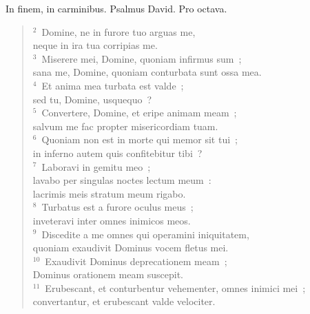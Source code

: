 \lettrine[lines=3,image=true,loversize=0.05,lraise=-0.03]{I}{}n finem, in carminibus. Psalmus David. Pro octava.
\begin{flushleft}\begin{verse}\vspace{6pt}${}^{2}$~Domine, ne in furore tuo arguas me,\\ neque in ira tua corripias me.\\
${}^{3}$~Miserere mei, Domine, quoniam infirmus sum~;\\ sana me, Domine, quoniam conturbata sunt ossa mea.\\
${}^{4}$~Et anima mea turbata est valde~;\\ sed tu, Domine, usquequo~?\\
${}^{5}$~Convertere, Domine, et eripe animam meam~;\\ salvum me fac propter misericordiam tuam.\\
${}^{6}$~Quoniam non est in morte qui memor sit tui~;\\ in inferno autem quis confitebitur tibi~?\\
${}^{7}$~Laboravi in gemitu meo~;\\ lavabo per singulas noctes lectum meum~:\\ lacrimis meis stratum meum rigabo.\\
${}^{8}$~Turbatus est a furore oculus meus~;\\ inveteravi inter omnes inimicos meos.\\
${}^{9}$~Discedite a me omnes qui operamini iniquitatem,\\ quoniam exaudivit Dominus vocem fletus mei.\\
${}^{10}$~Exaudivit Dominus deprecationem meam~;\\ Dominus orationem meam suscepit.\\
${}^{11}$~Erubescant, et conturbentur vehementer, omnes inimici mei~;\\ convertantur, et erubescant valde velociter.\end{verse}\end{flushleft}



